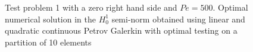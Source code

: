 \begin{figure}
	\centering
	\caption{Test problem 1 with a zero right hand side and $Pe =500$. Optimal numerical solution in the $H^1_0$ semi-norm obtained using linear and quadratic continuous Petrov Galerkin with optimal testing  on a partition of 10 elements}
	\label{fig:optimaltestfunc4}
\end{figure}

